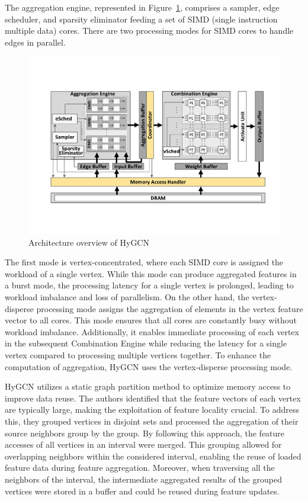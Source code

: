 The aggregation engine, represented in Figure~\ref{fig:hygcn_architecture}, comprises a sampler, edge scheduler, and sparsity eliminator feeding a set of SIMD (single instruction multiple data) cores.
There are two processing modes for SIMD cores to handle edges in parallel.

\begin{figure}[t]
    \centering
    \includegraphics[height=0.3\textwidth]{Images/HyGCN_architecture}
    \caption{Architecture overview of HyGCN~\cite{DBLP:journals/corr/abs-2001-02514}}
    \label{fig:hygcn_architecture}
\end{figure}

The first mode is vertex-concentrated, where each SIMD core is assigned the workload of a single vertex.
While this mode can produce aggregated features in a burst mode, the processing latency for a single vertex is prolonged, leading to workload imbalance and loss of parallelism.
On the other hand, the vertex-disperse processing mode assigns the aggregation of elements in the vertex feature vector to all cores.
This mode ensures that all cores are constantly busy without workload imbalance.
Additionally, it enables immediate processing of each vertex in the subsequent Combination Engine while reducing the latency for a single vertex compared to processing multiple vertices together.
To enhance the computation of aggregation, HyGCN uses the vertex-disperse processing mode.

HyGCN utilizes a static graph partition method to optimize memory access to improve data reuse.
The authors identified that the feature vectors of each vertex are typically large, making the exploitation of feature locality crucial.
To address this, they grouped vertices in disjoint sets and processed the aggregation of their source neighbors group by the group.
By following this approach, the feature accesses of all vertices in an interval were merged.
This grouping allowed for overlapping neighbors within the considered interval, enabling the reuse of loaded feature data during feature aggregation.
Moreover, when traversing all the neighbors of the interval, the intermediate aggregated results of the grouped vertices were stored in a buffer and could be reused during feature updates.


